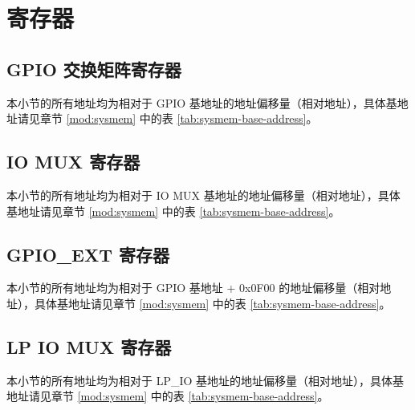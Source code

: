 \documentclass[main\_\_CN.tex]{subfiles}
\begin{document}
\section{寄存器}

\subsection{GPIO 交换矩阵寄存器}
本小节的所有地址均为相对于 GPIO 基地址的地址偏移量（相对地址），具体基地址请见章节 \ref{mod:sysmem} \textit{} 中的表 \ref{tab:sysmem-base-address}。


\subsection{IO MUX 寄存器}
本小节的所有地址均为相对于 IO MUX 基地址的地址偏移量（相对地址），具体基地址请见章节 \ref{mod:sysmem} \textit{} 中的表 \ref{tab:sysmem-base-address}。


\subsection{GPIO\_EXT 寄存器}
本小节的所有地址均为相对于 GPIO 基地址 + 0x0F00 的地址偏移量（相对地址），具体基地址请见章节 \ref{mod:sysmem} \textit{} 中的表 \ref{tab:sysmem-base-address}。


\subsection{LP IO MUX 寄存器}
本小节的所有地址均为相对于 LP\_IO 基地址的地址偏移量（相对地址），具体基地址请见章节 \ref{mod:sysmem} \textit{} 中的表 \ref{tab:sysmem-base-address}。

\end{document}
